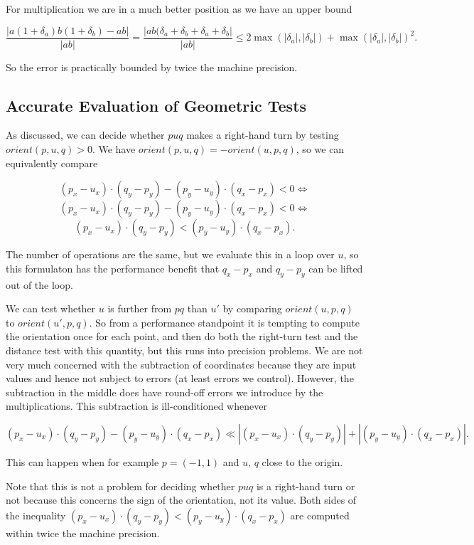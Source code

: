 For multiplication we are in a much better position as we have an upper bound

$$\frac{|a(1 + \delta_a)b(1 + \delta_b) - ab|}{|ab|} =
\frac{|ab(\delta_a + \delta_b + \delta_a + \delta_b|}{|ab|} \leq
2\max(|\delta_a|, |\delta_b|) + \max(|\delta_a|, |\delta_b|)^2.$$

So the error is practically bounded by twice the machine precision.

\subsection{Accurate Evaluation of Geometric Tests}

As discussed, we can decide whether $puq$ makes a right-hand turn by testing
$orient(p, u, q) > 0$. We have $orient(p, u, q) = -orient(u, p, q)$, so
we can equivalently compare

$$(p_x - u_x) \cdot (q_y - p_y) - (p_y - u_y) \cdot (q_x - p_x) < 0 \iff$$
$$(p_x - u_x) \cdot (q_y - p_y) - (p_y - u_y) \cdot (q_x - p_x) < 0 \iff$$
$$(p_x - u_x) \cdot (q_y - p_y) < (p_y - u_y) \cdot (q_x - p_x).$$

The number of operations are the same, but we evaluate this in a loop over $u$, 
so this formulaton has the performance benefit that $q_x - p_x$ and $q_y - p_y$ 
can be lifted out of the loop.

We can test whether $u$ is further from $pq$ than $u'$ by comparing
$orient(u, p, q)$ to $orient(u', p, q)$. So from a performance standpoint it
is tempting to compute the orientation once for each point, and then do both
the right-turn test and the distance test with this quantity, but this
runs into precision problems. We are not very much concerned with the
subtraction of coordinates because they are input values and hence not
subject to errors (at least errors we control). However, the subtraction 
in the middle does have round-off errors we introduce by the multiplications.
This subtraction is ill-conditioned whenever

$$(p_x - u_x) \cdot (q_y - p_y) - (p_y - u_y) \cdot (q_x - p_x) \ll
|(p_x - u_x) \cdot (q_y - p_y)| + |(p_y - u_y) \cdot (q_x - p_x)|.$$

This can happen when for example $p = (-1, 1)$ and $u$, $q$ close to
the origin.

Note that this is not a problem for deciding whether $puq$ is a
right-hand turn or not because this concerns the sign of the orientation,
not its value. Both sides of the inequality
$(p_x - u_x) \cdot (q_y - p_y) < (p_y - u_y) \cdot (q_x - p_x)$ are
computed within twice the machine precision.

